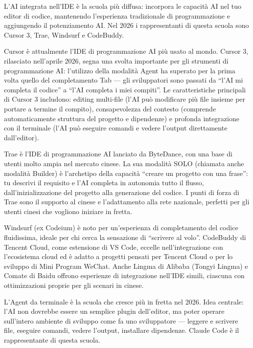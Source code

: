 
L'AI integrata nell'IDE è la scuola più diffusa: incorpora le capacità AI nel tuo editor di codice, mantenendo l'esperienza tradizionale di programmazione e aggiungendo il potenziamento AI. Nel 2026 i rappresentanti di questa scuola sono Cursor 3, Trae, Windsurf e CodeBuddy.


Cursor è attualmente l'IDE di programmazione AI più usato al mondo. Cursor 3, rilasciato nell'aprile 2026, segna una svolta importante per gli strumenti di programmazione AI: l'utilizzo della modalità Agent ha superato per la prima volta quello del completamento Tab — gli sviluppatori sono passati da “l'AI mi completa il codice” a “l'AI completa i miei compiti”. Le caratteristiche principali di Cursor 3 includono: editing multi-file (l'AI può modificare più file insieme per portare a termine il compito), consapevolezza del contesto (comprende automaticamente struttura del progetto e dipendenze) e profonda integrazione con il terminale (l'AI può eseguire comandi e vedere l'output direttamente dall'editor).


Trae è l'IDE di programmazione AI lanciato da ByteDance, con una base di utenti molto ampia nel mercato cinese. La sua modalità SOLO (chiamata anche modalità Builder) è l'archetipo della capacità “creare un progetto con una frase”: tu descrivi il requisito e l'AI completa in autonomia tutto il flusso, dall'inizializzazione del progetto alla generazione del codice. I punti di forza di Trae sono il supporto al cinese e l'adattamento alla rete nazionale, perfetti per gli utenti cinesi che vogliono iniziare in fretta.


Windsurf (ex Codeium) è noto per un'esperienza di completamento del codice fluidissima, ideale per chi cerca la sensazione di “scrivere al volo”. CodeBuddy di Tencent Cloud, come estensione di VS Code, eccelle nell'integrazione con l'ecosistema cloud ed è adatto a progetti pensati per Tencent Cloud o per lo sviluppo di Mini Program WeChat. Anche Lingma di Alibaba (Tongyi Lingma) e Comate di Baidu offrono esperienze di integrazione nell'IDE simili, ciascuna con ottimizzazioni proprie per gli scenari in cinese.


L'Agent da terminale è la scuola che cresce più in fretta nel 2026. Idea centrale: l'AI non dovrebbe essere un semplice plugin dell'editor, ma poter operare sull'intero ambiente di sviluppo come fa uno sviluppatore — leggere e scrivere file, eseguire comandi, vedere l'output, installare dipendenze. Claude Code è il rappresentante di questa scuola.

